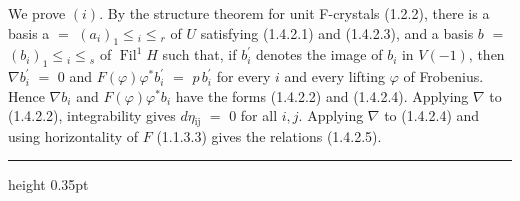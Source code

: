 \documentclass[9pt]{article}
\newcommand{\CanonText}[1]{\par{\fontsize{8.0}{9.35}\selectfont\RaggedRight #1\par}\vspace{2.2pt}}
\begin{document}
\begin{minipage}[t][\dimexpr\textheight-5pt\relax][t]{\textwidth}
\CanonText{We prove \((i)\). By the structure theorem for unit F-crystals (1.2.2), there is a basis a \(=\) \((a_{i})_{1}\leq{}_{i}\leq{}_{r}\) of \(U\) satisfying (1.4.2.1) and (1.4.2.3), and a basis \(b\) \(=\) \((b_{i})_{1}\leq{}_{i}\leq{}_{s}\) of \(\operatorname{Fil}^{1}H\) such that, if \(b^{\prime}_{i}\) denotes the image of \(b_{i}\) in \(V(-1)\), then \(\nabla{}b^{\prime}_{i}\) \(=\) 0 and \(F(\varphi{})\varphi{}^{*}b^{\prime}_{i}\) \(=\) \(p\,b^{\prime}_{i}\) for every \(i\) and every lifting \(\varphi{}\) of Frobenius. Hence \(\nabla{}b_{i}\) and \(F(\varphi{})\varphi{}^{*}b_{i}\) have the forms (1.4.2.2) and (1.4.2.4). Applying \(\nabla{}\) to (1.4.2.2), integrability gives \(d\eta{}_{\mathrm{ij}}\) \(=\) 0 for all \(i,j\). Applying \(\nabla{}\) to (1.4.2.4) and using horizontality of \(F\) (1.1.3.3) gives the relations (1.4.2.5).}
\vfill
{\color{Accent}\hrule height 0.35pt}\vspace{3pt}
\end{minipage}
\newpage
\end{document}
